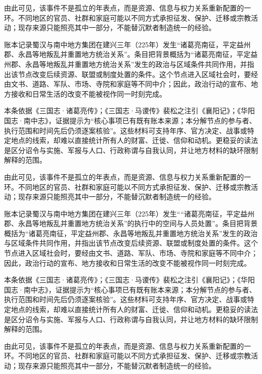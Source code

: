 由此可见，该事件不是孤立的年表点，而是资源、信息与权力关系重新配置的一环。不同地区的官员、社群和家庭可能以不同方式承担征发、保护、迁移或宗教活动；现存来源只能照亮其中一部分，不能替沉默者制造统一的经验。

账本记录蜀汉与南中地方集团在建兴三年（225年）发生“诸葛亮南征，平定益州郡、永昌等地叛乱并重置地方统治关系”。条目把背景概括为“诸葛亮南征，平定益州郡、永昌等地叛乱并重置地方统治关系”发生的政治与区域条件共同作用，并指出该节点改变后续资源、联盟或制度处置的条件。这个节点进入区域社会时，要经由文书、道路、军队、市场、寺院和家庭等不同中介；因此，政治行动的宣布、地方接收和日常生活的改变不能被视作同一时刻完成。

本条依据《三国志·诸葛亮传》；《三国志·马谡传》裴松之注引《襄阳记》；《华阳国志·南中志》，证据提示为“核心事项已有既有账本来源；本分解节点的参与者、执行范围和时间先后仍须逐案核验”。这些材料可支持年序、官方决定、战事或特定地点的线索，却难以直接统计所有人的财富、迁徙、信仰和动机。更稳妥的读法是区分诏令与实施、军报与人口、行政称谓与自我认同，并让地方材料的缺环限制解释的范围。

由此可见，该事件不是孤立的年表点，而是资源、信息与权力关系重新配置的一环。不同地区的官员、社群和家庭可能以不同方式承担征发、保护、迁移或宗教活动；现存来源只能照亮其中一部分，不能替沉默者制造统一的经验。

账本记录蜀汉与南中地方集团在建兴三年（225年）发生““诸葛亮南征，平定益州郡、永昌等地叛乱并重置地方统治关系”的执行中的空间与人员处置”。条目把背景概括为“诸葛亮南征，平定益州郡、永昌等地叛乱并重置地方统治关系”发生的政治与区域条件共同作用，并指出该节点改变后续资源、联盟或制度处置的条件。这个节点进入区域社会时，要经由文书、道路、军队、市场、寺院和家庭等不同中介；因此，政治行动的宣布、地方接收和日常生活的改变不能被视作同一时刻完成。

本条依据《三国志·诸葛亮传》；《三国志·马谡传》裴松之注引《襄阳记》；《华阳国志·南中志》，证据提示为“核心事项已有既有账本来源；本分解节点的参与者、执行范围和时间先后仍须逐案核验”。这些材料可支持年序、官方决定、战事或特定地点的线索，却难以直接统计所有人的财富、迁徙、信仰和动机。更稳妥的读法是区分诏令与实施、军报与人口、行政称谓与自我认同，并让地方材料的缺环限制解释的范围。

由此可见，该事件不是孤立的年表点，而是资源、信息与权力关系重新配置的一环。不同地区的官员、社群和家庭可能以不同方式承担征发、保护、迁移或宗教活动；现存来源只能照亮其中一部分，不能替沉默者制造统一的经验。

